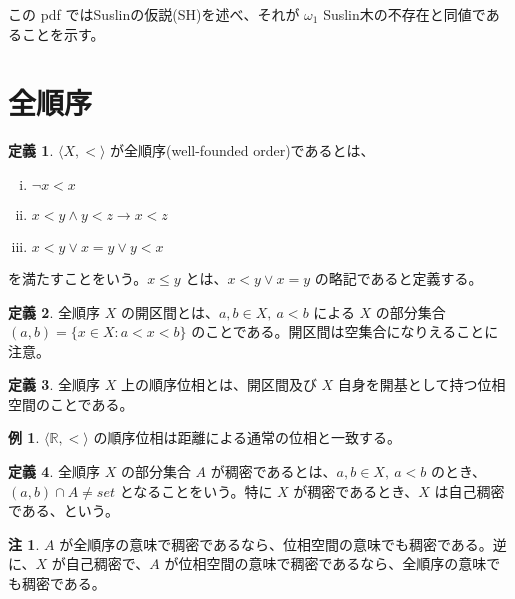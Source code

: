 \documentclass{jsarticle}
\theoremstyle{definition}
\newtheorem*{definition*}{定義}
\newtheorem{remark}{注}[section]
\newtheorem{example}{例}[section]
\begin{document}
    この pdf ではSuslinの仮説(SH)を述べ、それが $\omega_1$ Suslin木の不存在と同値であることを示す。
    \section{全順序}
    \begin{definition*} \label{total_order}
        $\langle X, < \rangle$ が全順序(well-founded order)であるとは、
        \begin{enumerate}[(i)]
            \item $\lnot x < x$
            \item $x < y \land y < z \rightarrow x < z$
            \item $x < y \lor x = y \lor y < x$
        \end{enumerate}
        を満たすことをいう。$x \leq y$ とは、$x < y \lor x = y$ の略記であると定義する。
    \end{definition*}
    
    \vspace{0.5ex}
    
    \begin{definition*} \label{open_interval}
        全順序 $X$ の開区間とは、$a, b \in X, \ a < b$ による $X$ の部分集合 $(a, b) = \{x \in X : a < x < b\}$ のことである。開区間は空集合になりえることに注意。
    \end{definition*}
    
    \begin{definition*} \label{order_topology}
        全順序 $X$ 上の順序位相とは、開区間及び $X$ 自身を開基として持つ位相空間のことである。
    \end{definition*}
    
    \begin{example}
        $\langle \mathbb{R}, < \rangle$ の順序位相は距離による通常の位相と一致する。
    \end{example}
    
    \vspace{0.5ex}
    
    \begin{definition*}  全順序 $X$ の部分集合 $A$ が稠密であるとは、$a, b \in X, \ a < b$ のとき、$(a,b) \cap A \neq set$ となることをいう。特に $X$ が稠密であるとき、$X$ は自己稠密である、という。
    \end{definition*}
    
    \begin{remark}
        $A$ が全順序の意味で稠密であるなら、位相空間の意味でも稠密である。逆に、$X$ が自己稠密で、$A$ が位相空間の意味で稠密であるなら、全順序の意味でも稠密である。
    \end{remark}
    
\end{document}
